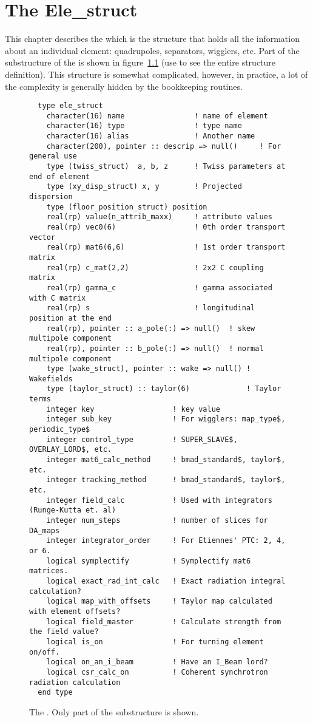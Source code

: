 \chapter{The Ele_struct}
\label{c:ele_struct}

This chapter describes the  which is the structure that
holds all the information about an individual element: quadrupoles,
separators, wigglers, etc. 
Part of the substructure of the  is shown
in figure~\ref{f:ele_struct} (use  to see the entire structure 
definition). This structure is somewhat
complicated, however, in practice, a lot of the complexity is
generally hidden  by the \bmad bookkeeping routines.

\begin{figure}[htb]
\centering
\small
\begin{verbatim}
  type ele_struct
    character(16) name                ! name of element
    character(16) type                ! type name
    character(16) alias               ! Another name
    character(200), pointer :: descrip => null()     ! For general use
    type (twiss_struct)  a, b, z      ! Twiss parameters at end of element
    type (xy_disp_struct) x, y        ! Projected dispersion
    type (floor_position_struct) position
    real(rp) value(n_attrib_maxx)     ! attribute values
    real(rp) vec0(6)                  ! 0th order transport vector
    real(rp) mat6(6,6)                ! 1st order transport matrix
    real(rp) c_mat(2,2)               ! 2x2 C coupling matrix
    real(rp) gamma_c                  ! gamma associated with C matrix
    real(rp) s                        ! longitudinal position at the end
    real(rp), pointer :: a_pole(:) => null()  ! skew multipole component
    real(rp), pointer :: b_pole(:) => null()  ! normal multipole component
    type (wake_struct), pointer :: wake => null() ! Wakefields
    type (taylor_struct) :: taylor(6)             ! Taylor terms
    integer key                  ! key value
    integer sub_key              ! For wigglers: map_type$, periodic_type$
    integer control_type         ! SUPER_SLAVE$, OVERLAY_LORD$, etc.
    integer mat6_calc_method     ! bmad_standard$, taylor$, etc.
    integer tracking_method      ! bmad_standard$, taylor$, etc.
    integer field_calc           ! Used with integrators (Runge-Kutta et. al)
    integer num_steps            ! number of slices for DA_maps
    integer integrator_order     ! For Etiennes' PTC: 2, 4, or 6.
    logical symplectify          ! Symplectify mat6 matrices.
    logical exact_rad_int_calc   ! Exact radiation integral calculation?
    logical map_with_offsets     ! Taylor map calculated with element offsets?
    logical field_master         ! Calculate strength from the field value?
    logical is_on                ! For turning element on/off.
    logical on_an_i_beam         ! Have an I_Beam lord?
    logical csr_calc_on          ! Coherent synchrotron radiation calculation
  end type
\end{verbatim}
\caption[The .]{The . Only part of the 
  substructure is shown.}
\label{f:ele_struct}
\end{figure}

